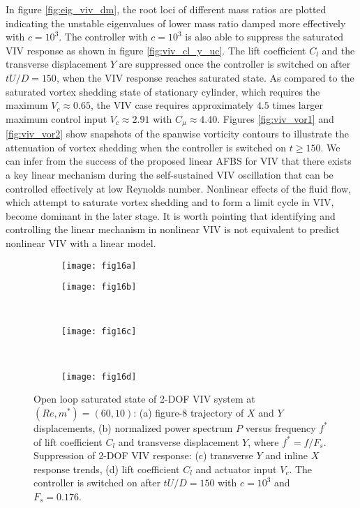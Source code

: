 \documentclass[standard]{jfm}
\begin{document}
In figure \ref{fig:eig_viv_dm}, 
the root loci of different mass ratios are plotted indicating the 
unstable eigenvalues of lower mass ratio damped more effectively with $c=10^3$. 
%
The controller with $c=10^3$ is also able to suppress the saturated VIV response 
as shown in figure \ref{fig:viv_cl_y_uc}. The lift coefficient $C_l$ and the transverse 
displacement $Y$ are suppressed once the controller is switched on after $tU/D=150$, when
the VIV response reaches saturated state. 
As compared to the saturated vortex shedding state
of stationary  cylinder, which requires the maximum $V_c \approx 0.65$, the VIV case requires approximately $4.5$ times larger 
maximum control input $V_c \approx 2.91$ with $C_\mu \approx 4.40$. 
%
Figures \ref{fig:viv_vor1} and \ref{fig:viv_vor2} show snapshots of the spanwise vorticity contours to illustrate the attenuation of vortex shedding when the controller is 
switched on $t\geqslant 150$. 
%
We can infer from the success of the proposed linear AFBS for VIV that there exists 
a key linear mechanism during the self-sustained 
VIV oscillation that can be controlled effectively at low Reynolds number.
Nonlinear effects of the fluid flow, which 
attempt to saturate vortex shedding and to form a limit cycle in VIV, 
become dominant in the later stage.
It is worth pointing that identifying and controlling the linear mechanism
in nonlinear VIV is not equivalent to predict nonlinear VIV with a
linear model. 

 
\begin{figure}
\centering
  \begin{subfigure}[c]{0.47\textwidth}
\centering
  \texttt{[image: fig16a]} 
    \caption{}
    \label{fig:viv2dof_saturated}
    \end{subfigure}  
    \begin{subfigure}[c]{0.47\textwidth}
\centering
  \texttt{[image: fig16b]} 
    \caption{}
    \label{fig:viv2dof_f}
    \end{subfigure}    \\
\begin{subfigure}[b]{\columnwidth} 
\centering
  \texttt{[image: fig16c]}
	\caption{}
	\label{fig:viv2dof_xy}
	\end{subfigure}	\\
\begin{subfigure}[b]{\columnwidth} 
\centering
  \texttt{[image: fig16d]} 
	\caption{}
	\label{fig:viv2dof_Vc}
	\end{subfigure}				
\caption{ Open loop saturated state of 2-DOF VIV system at $(Re,m^*)=(60,10)$: (a) figure-8 trajectory of $X$ and $Y$ displacements,
         (b) normalized power spectrum $P$ versus frequency $f^*$ of lift coefficient $C_l$ and transverse displacement $Y$, 
         where $f^*=f/F_s$. 
         Suppression of 2-DOF VIV response: (c) transverse $Y$ and inline $X$ response trends,
         (d) lift coefficient $C_l$ and actuator input $V_c$. 
          The controller is switched on after $tU/D=150$ with $c=10^3$ and $F_s=0.176$.  }
\end{figure}
\end{document}
